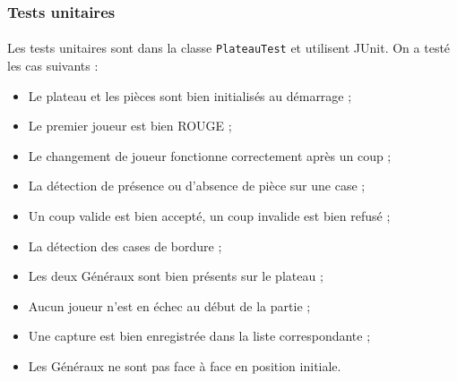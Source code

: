 \subsubsection{Tests unitaires}
\paragraph{} Les tests unitaires sont dans la classe \texttt{PlateauTest} et utilisent JUnit. On a testé les cas suivants :
\begin{itemize}
\item Le plateau et les pièces sont bien initialisés au démarrage ;
\item Le premier joueur est bien ROUGE ;
\item Le changement de joueur fonctionne correctement après un coup ;
\item La détection de présence ou d'absence de pièce sur une case ;
\item Un coup valide est bien accepté, un coup invalide est bien refusé ;
\item La détection des cases de bordure ;
\item Les deux Généraux sont bien présents sur le plateau ;
\item Aucun joueur n'est en échec au début de la partie ;
\item Une capture est bien enregistrée dans la liste correspondante ;
\item Les Généraux ne sont pas face à face en position initiale.
\end{itemize}

